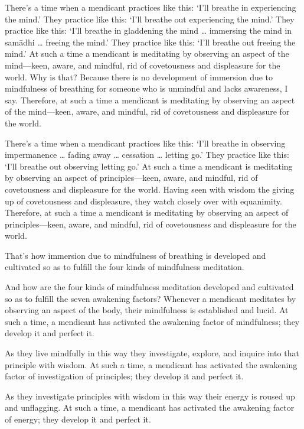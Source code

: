 \documentclass[12pt,openany]{book}%
\begin{document}
There’s a time when a mendicant practices like this: ‘I’ll breathe in experiencing the mind.’ They practice like this: ‘I’ll breathe out experiencing the mind.’ They practice like this: ‘I’ll breathe in gladdening the mind … immersing the mind in \textsanskrit{samādhi} … freeing the mind.’ They practice like this: ‘I’ll breathe out freeing the mind.’ At such a time a mendicant is meditating by observing an aspect of the mind—keen, aware, and mindful, rid of covetousness and displeasure for the world. Why is that? Because there is no development of immersion due to mindfulness of breathing for someone who is unmindful and lacks awareness, I say. Therefore, at such a time a mendicant is meditating by observing an aspect of the mind—keen, aware, and mindful, rid of covetousness and displeasure for the world. 

There’s a time when a mendicant practices like this: ‘I’ll breathe in observing impermanence … fading away … cessation … letting go.’ They practice like this: ‘I’ll breathe out observing letting go.’ At such a time a mendicant is meditating by observing an aspect of principles—keen, aware, and mindful, rid of covetousness and displeasure for the world. Having seen with wisdom the giving up of covetousness and displeasure, they watch closely over with equanimity. Therefore, at such a time a mendicant is meditating by observing an aspect of principles—keen, aware, and mindful, rid of covetousness and displeasure for the world. 

That’s how immersion due to mindfulness of breathing is developed and cultivated so as to fulfill the four kinds of mindfulness meditation. 

And how are the four kinds of mindfulness meditation developed and cultivated so as to fulfill the seven awakening factors? Whenever a mendicant meditates by observing an aspect of the body, their mindfulness is established and lucid. At such a time, a mendicant has activated the awakening factor of mindfulness; they develop it and perfect it. 

As they live mindfully in this way they investigate, explore, and inquire into that principle with wisdom. At such a time, a mendicant has activated the awakening factor of investigation of principles; they develop it and perfect it. 

As they investigate principles with wisdom in this way their energy is roused up and unflagging. At such a time, a mendicant has activated the awakening factor of energy; they develop it and perfect it. 
\end{document}
